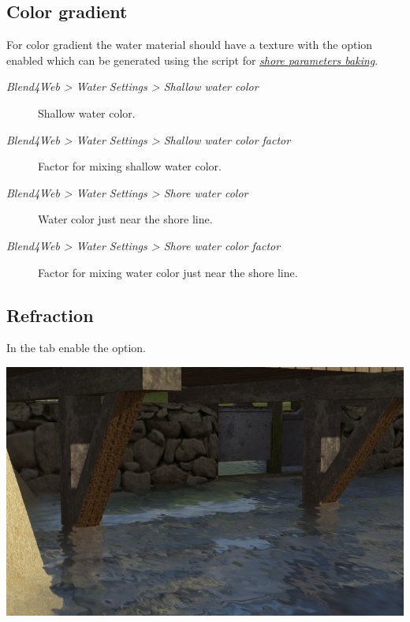 \documentclass[a4paper,12pt,oneside]{sphinxmanual}
\begin{document}
\subsection{Color gradient}
\label{outdoor_rendering:id9}
For color gradient the water material should have a texture with the  option enabled which can be generated using the script for {\hyperref[outdoor_rendering:shore-distance-bake]{\emph{shore parameters baking}}}.
\begin{description}
\item[{\emph{Blend4Web \textgreater{} Water Settings \textgreater{} Shallow water color}}] \leavevmode
Shallow water color.

\item[{\emph{Blend4Web \textgreater{} Water Settings \textgreater{} Shallow water color factor}}] \leavevmode
Factor for mixing shallow water color.

\item[{\emph{Blend4Web \textgreater{} Water Settings \textgreater{} Shore water color}}] \leavevmode
Water color just near the shore line.

\item[{\emph{Blend4Web \textgreater{} Water Settings \textgreater{} Shore water color factor}}] \leavevmode
Factor for mixing water color just near the shore line.

\end{description}


\subsection{Refraction}
\label{outdoor_rendering:id10}
In the  tab enable the  option.

{\hfill\includegraphics[width=1.000\linewidth]{water_refraction.jpg}\hfill}
\end{document}
